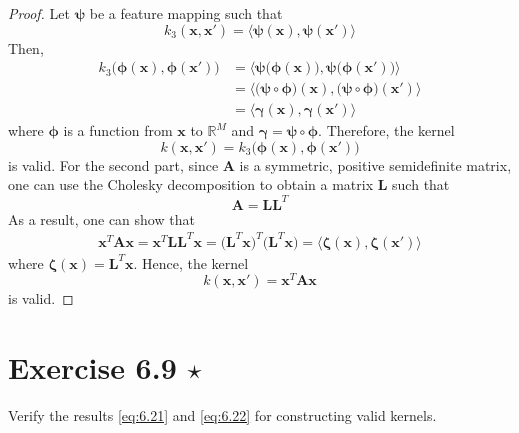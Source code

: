 \begin{proof}
    Let $\bm{\psi}$ be a feature mapping such that
    \[
        k_3(\mathbf{x}, \mathbf{x}') 
        = \langle \bm{\psi}(\mathbf{x}), \bm{\psi}(\mathbf{x}') \rangle
    \] 
    Then,
    \begin{align*}
        k_3\big(\bm{\phi}(\mathbf{x}), \bm{\phi}(\mathbf{x}')\big)
        &= \langle \bm{\psi}\big(\bm{\phi}(\mathbf{x})\big),
            \bm{\psi}\big(\bm{\phi}(\mathbf{x}')\big)\rangle \\
        &= \langle \big(\bm{\psi} \circ \bm{\phi}\big)(\mathbf{x}),
            \big(\bm{\psi} \circ \bm{\phi}\big)(\mathbf{x}')\rangle \\
        &= \langle \bm{\gamma}(\mathbf{x}), \bm{\gamma}(\mathbf{x}')\rangle
    \end{align*}
    where $\bm{\phi}$ is a function from $\mathbf{x}$ to $\mathbb{R}^M$ and
    $\bm{\gamma} = \bm{\psi} \circ \bm{\phi}$. Therefore, the kernel
    \begin{equation}\label{eq:6.19}\tag{6.19} 
        k(\mathbf{x}, \mathbf{x}') = k_3\big(\bm{\phi}(\mathbf{x}),
        \bm{\phi}(\mathbf{x}')\big)
    \end{equation}
    is valid. For the second part, since $\mathbf{A}$ is a 
    symmetric, positive semidefinite matrix, one can use the Cholesky
    decomposition to obtain a matrix $\mathbf{L}$ such that
    \[
        \mathbf{A} = \mathbf{L} \mathbf{L}^T
    \] 
    As a result, one can show that
    \begin{align*}
        \mathbf{x}^T \mathbf{A} \mathbf{x}
        = \mathbf{x}^T \mathbf{L} \mathbf{L}^T \mathbf{x}
        = \big(\mathbf{L}^T \mathbf{x}\big)^T \big(\mathbf{L}^T \mathbf{x}\big)
        = \langle \bm{\zeta}(\mathbf{x}), \bm{\zeta}(\mathbf{x}') \rangle
    \end{align*}
    where $\bm{\zeta}(\mathbf{x}) = \mathbf{L}^T \mathbf{x}$.
    Hence, the kernel
    \begin{equation}\label{eq:6.20}\tag{6.20}
        k(\mathbf{x}, \mathbf{x}') = \mathbf{x}^T \mathbf{A} \mathbf{x}
    \end{equation}
    is valid.
\end{proof} 

\section*{Exercise 6.9 $\star$}
Verify the results \eqref{eq:6.21} and \eqref{eq:6.22} for constructing valid kernels.


